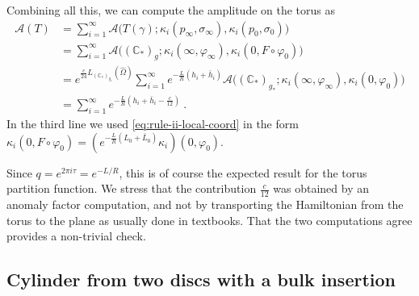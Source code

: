 \documentclass[11pt,a4paper]{article}
\numberwithin{equation}{section}
\begin{document}
Combining all this, we can compute the amplitude on the torus as
\begin{align}     
\mathcal{A}(T) 
     &=
     \sum_{i=1}^\infty \mathcal{A}\big(T(\gamma); \kappa_i(p_\infty,\sigma_\infty), \kappa_i(p_0,\sigma_0) \big)
\nonumber
\\
     &=
     \sum_{i=1}^\infty \mathcal{A}\big((\mathbb{C}_*)_g; \kappa_i(\infty,\varphi_\infty) , \kappa_i(0,F \circ \varphi_0) \big) 
\nonumber
\\
     &= e^{\frac{c}{24}L_{(\mathbb{C}_*)_{g_*}}\!(\hat\Omega)} 
     \sum_{i=1}^\infty 
     e^{-\frac{L}{R}(h_i+\bar h_i)}
     \mathcal{A}\big((\mathbb{C}_*)_{g_*}; \kappa_i(\infty,\varphi_\infty) , \kappa_i(0,\varphi_0) \big)
\nonumber
\\
     &=  
     \sum_{i=1}^\infty e^{-\frac{L}{R}(h_i + \bar h_i - \frac{c}{12})} \ .
\end{align}
In the third line we used \eqref{eq:rule-ii-local-coord} in the form $\kappa_i(0,F \circ \varphi_0) = (e^{-\frac{L}{R}(L_0+\bar L_0)}\kappa_i)(0,\varphi_0)$.

Since $q = e^{2 \pi i \tau} = e^{-L/R}$, this is of course the expected result for the torus partition function. We stress that the contribution $\frac{c}{12}$ was obtained by an anomaly factor computation, and not by transporting the Hamiltonian from the torus to the plane as usually done in textbooks. That the two computations agree provides a non-trivial check.

\subsection{Cylinder from two discs with a bulk insertion}\label{sec:cylinder-closed-factorisation}
\end{document}
